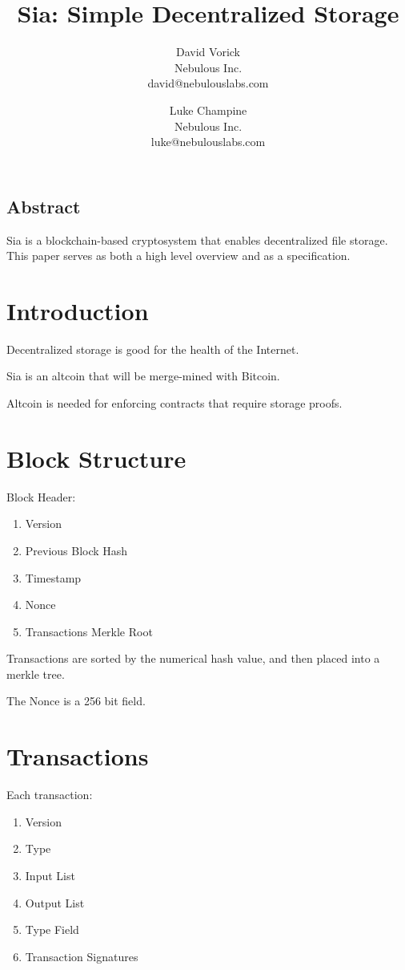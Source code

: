 \documentclass[twocolumn]{article}
\begin{document}
\frenchspacing

\title{Sia: Simple Decentralized Storage}

\author{
{\rm David Vorick}\\
Nebulous Inc.\\
david@nebulouslabs.com
\and
{\rm Luke Champine}\\
Nebulous Inc.\\
luke@nebulouslabs.com
}

\maketitle

\subsection*{Abstract}
Sia is a blockchain-based cryptosystem that enables decentralized file storage.
This paper serves as both a high level overview and as a specification.

\section{Introduction}
Decentralized storage is good for the health of the Internet.

Sia is an altcoin that will be merge-mined with Bitcoin.

Altcoin is needed for enforcing contracts that require storage proofs.

\section{Block Structure}
Block Header:
\begin{enumerate}
	\item Version
	\item Previous Block Hash
	\item Timestamp
	\item Nonce
	\item Transactions Merkle Root
\end{enumerate}

Transactions are sorted by the numerical hash value, and then placed into a merkle tree.

The Nonce is a 256 bit field.

\section{Transactions}
Each transaction:
\begin{enumerate}
	\item Version
	\item Type
	\item Input List
	\item Output List
	\item Type Field
	\item Transaction Signatures
\end{enumerate}
\end{document}
